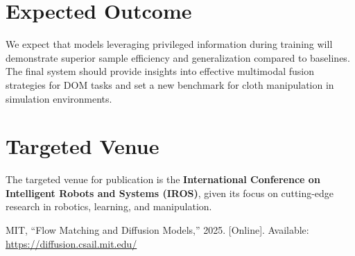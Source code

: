 \documentclass{article}
\begin{document}
\section{Expected Outcome}
We expect that models leveraging privileged information during training will demonstrate superior sample efficiency and generalization compared to baselines. The final system should provide insights into effective multimodal fusion strategies for DOM tasks and set a new benchmark for cloth manipulation in simulation environments.

\section{Targeted Venue}
The targeted venue for publication is the \textbf{International Conference on Intelligent Robots and Systems (IROS)}, given its focus on cutting-edge research in robotics, learning, and manipulation.


\begin{thebibliography}{1}
MIT, ``Flow Matching and Diffusion Models,'' 2025. [Online]. Available: \url{https://diffusion.csail.mit.edu/}
\end{thebibliography}
\end{document}
